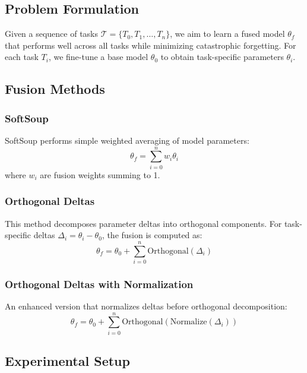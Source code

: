 \documentclass[11pt,a4paper]{article}
\begin{document}
\subsection{Problem Formulation}

Given a sequence of tasks $\mathcal{T} = \{T_0, T_1, \ldots, T_n\}$, we aim to learn a fused model $\theta_f$ that performs well across all tasks while minimizing catastrophic forgetting. For each task $T_i$, we fine-tune a base model $\theta_0$ to obtain task-specific parameters $\theta_i$.

\subsection{Fusion Methods}

\subsubsection{SoftSoup}
SoftSoup performs simple weighted averaging of model parameters:
\begin{equation}
\theta_f = \sum_{i=0}^{n} w_i \theta_i
\end{equation}
where $w_i$ are fusion weights summing to 1.

\subsubsection{Orthogonal Deltas}
This method decomposes parameter deltas into orthogonal components. For task-specific deltas $\Delta_i = \theta_i - \theta_0$, the fusion is computed as:
\begin{equation}
\theta_f = \theta_0 + \sum_{i=0}^{n} \text{Orthogonal}(\Delta_i)
\end{equation}

\subsubsection{Orthogonal Deltas with Normalization}
An enhanced version that normalizes deltas before orthogonal decomposition:
\begin{equation}
\theta_f = \theta_0 + \sum_{i=0}^{n} \text{Orthogonal}(\text{Normalize}(\Delta_i))
\end{equation}

\subsection{Experimental Setup}
\end{document}
